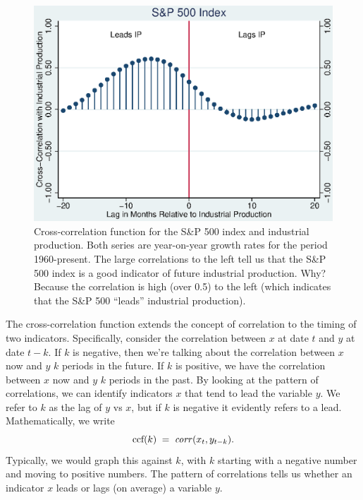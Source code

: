\documentclass[letterpaper,12pt]{article}
\begin{document}
\begin{figure}[h!]
    \centering
    \includegraphics[scale=0.8]{xcsp500.eps}
    \caption{Cross-correlation function for
    the S\&P 500 index and industrial production.
    Both series are year-on-year growth rates for the period
    1960-present.
    The large correlations to the left tell us that
    the S\&P 500 index is a good indicator of future industrial production.
    Why?  Because the correlation is high (over 0.5) to the left
    (which indicates that the S\&P 500 ``leads'' industrial production).}
    \label{fig:ccf-sp500}%
\end{figure}

The cross-correlation function extends the concept of correlation
to the timing of two indicators.
Specifically, consider the correlation between $x$ at date $t$
and $y$ at date $t-k$.  If $k$ is negative,
then we're talking about the correlation
between $x$ now and $y$ $k$ periods in the future.
If $k$ is positive, we have the correlation between $x$ now and
$y$ $k$ periods in the past.
By looking at the pattern of correlations,
we can identify indicators $x$ that tend to lead the variable $y$.
We refer to $k$ as the lag of $y$ vs $x$,
but if $k$ is negative it evidently refers to a lead.
Mathematically, we write
\[
    \mbox{ccf}(k) \;=\;  \mbox{\it corr\/} (x_t,y_{t-k}) .
\]
Typically, we would graph this against $k$, with $k$ starting
with a negative number and moving to positive numbers.
The pattern of correlations tells us whether an indicator $x$
leads or lags (on average) a variable $y$.
\end{document}
